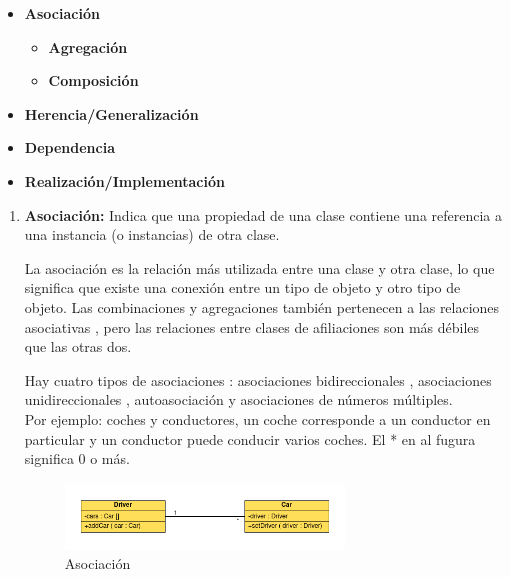 \documentclass[../main.tex]{subfiles}
\begin{document}
        \begin{itemize}
            \item \textbf{Asociación} 
                \begin{itemize}
                    \item \textbf{Agregación}
                    \item \textbf{Composición}
                \end{itemize}
            \item \textbf{Herencia/Generalización} 
            \item \textbf{Dependencia}
            \item  \textbf{Realización/Implementación}
        \end{itemize}

        \begin{enumerate}
            \item \textbf{Asociación:} 
                Indica que una propiedad de una clase contiene una referencia a una instancia (o instancias) de otra clase.
                
                La asociación es la relación más utilizada entre una clase y otra clase, lo que significa que existe una conexión entre un tipo de objeto y otro tipo de objeto. Las combinaciones y agregaciones también pertenecen a las relaciones asociativas , pero las relaciones entre clases de afiliaciones son más débiles que las otras dos.
                
                Hay cuatro tipos de asociaciones : asociaciones bidireccionales , asociaciones unidireccionales , autoasociación y asociaciones de números múltiples.\\
                
                Por ejemplo: coches y conductores, un coche corresponde a un conductor en particular y un conductor puede conducir varios coches. El * en al fugura significa 0 o más.

                \begin{figure}[ht]
                    \centering
                    \includegraphics[width=0.7\textwidth]{../images/uml_asociacion.png}
                    \caption{Asociación}
                    \label{fig:uml_asociacion}
                \end{figure}
                

\end{enumerate}
\end{document}

